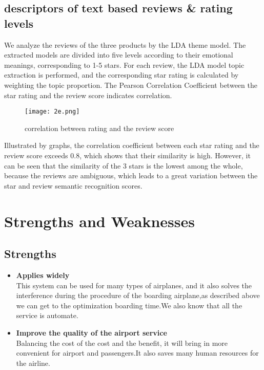 \documentclass{mcmthesis}
\begin{document}
\subsection{descriptors of text based reviews \& rating levels}
We analyze the reviews of the three products by the LDA theme model. The extracted models are divided into five levels according to their emotional meanings, corresponding to 1-5 stars. For each review, the LDA model topic extraction is performed, and the corresponding star rating is calculated by weighting the topic proportion. The Pearson Correlation Coefficient between the star rating and the review score indicates correlation.

\begin{figure}[h]
  \small
  \centering
  \texttt{[image: 2e.png]}
  \caption{correlation between rating and the review score}
\end{figure}

Illustrated by graphs, the correlation coefficient between each star rating and the review score exceeds 0.8, which shows that their similarity is high. However, it can be seen that the similarity of the 3 stars is the lowest among the whole, because the reviews are ambiguous, which leads to a great variation between the star and review semantic recognition scores.

\section{ Strengths and Weaknesses }
\subsection{Strengths}
\begin{itemize}
  \item \textbf{Applies widely}\\
        This  system can be used for many types of airplanes, and it also
        solves the interference during  the procedure of the boarding
        airplane,as described above we can get to the  optimization
        boarding time.We also know that all the service is automate.
  \item \textbf{Improve the quality of the airport service}\\
        Balancing the cost of the cost and the benefit, it will bring in
        more convenient  for airport and passengers.It also saves many
        human resources for the airline.
\end{itemize}
\end{document}
